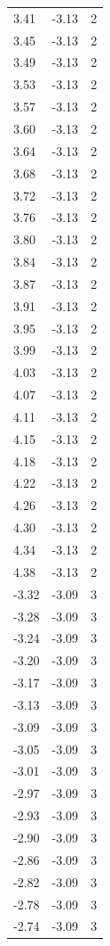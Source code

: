 \begin{longtable}{lrr}
  3.41 & -3.13 & 2 \\
  3.45 & -3.13 & 2 \\
  3.49 & -3.13 & 2 \\
  3.53 & -3.13 & 2 \\
  3.57 & -3.13 & 2 \\
  3.60 & -3.13 & 2 \\
  3.64 & -3.13 & 2 \\
  3.68 & -3.13 & 2 \\
  3.72 & -3.13 & 2 \\
  3.76 & -3.13 & 2 \\
  3.80 & -3.13 & 2 \\
  3.84 & -3.13 & 2 \\
  3.87 & -3.13 & 2 \\
  3.91 & -3.13 & 2 \\
  3.95 & -3.13 & 2 \\
  3.99 & -3.13 & 2 \\
  4.03 & -3.13 & 2 \\
  4.07 & -3.13 & 2 \\
  4.11 & -3.13 & 2 \\
  4.15 & -3.13 & 2 \\
  4.18 & -3.13 & 2 \\
  4.22 & -3.13 & 2 \\
  4.26 & -3.13 & 2 \\
  4.30 & -3.13 & 2 \\
  4.34 & -3.13 & 2 \\
  4.38 & -3.13 & 2 \\
  -3.32 & -3.09 & 3 \\
  -3.28 & -3.09 & 3 \\
  -3.24 & -3.09 & 3 \\
  -3.20 & -3.09 & 3 \\
  -3.17 & -3.09 & 3 \\
  -3.13 & -3.09 & 3 \\
  -3.09 & -3.09 & 3 \\
  -3.05 & -3.09 & 3 \\
  -3.01 & -3.09 & 3 \\
  -2.97 & -3.09 & 3 \\
  -2.93 & -3.09 & 3 \\
  -2.90 & -3.09 & 3 \\
  -2.86 & -3.09 & 3 \\
  -2.82 & -3.09 & 3 \\
  -2.78 & -3.09 & 3 \\
  -2.74 & -3.09 & 3 \\

\end{longtable}
